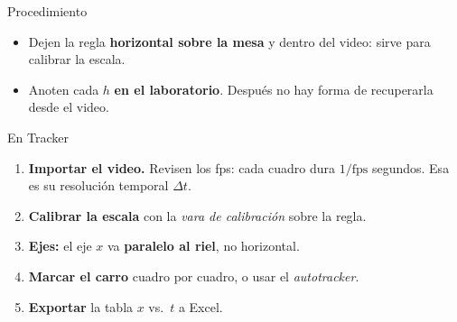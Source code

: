 \documentclass[aspectratio=169,xcolor=dvipsnames]{beamer}
\begin{document}
	\begin{frame}{Procedimiento}
		\begin{center}
		\end{center}
		
		\vspace{0.4cm}
		\begin{itemize}
			\setlength{\itemsep}{6pt}
			\item Dejen la regla \textbf{horizontal sobre la mesa} y dentro del video:
			sirve para calibrar la escala.
			\item Anoten cada $h$ \textbf{en el laboratorio}. Después no hay forma de
			recuperarla desde el video.
		\end{itemize}
	\end{frame}
	
	\begin{frame}{En Tracker}
		\begin{enumerate}
			\setlength{\itemsep}{8pt}
			\item \textbf{Importar el video.} Revisen los fps: cada cuadro dura
			$1/\text{fps}$ segundos. Esa es su resolución temporal $\Delta t$.
			\item \textbf{Calibrar la escala} con la \emph{vara de calibración}
			sobre la regla.
			\item \textbf{Ejes:} el eje $x$ va \textbf{paralelo al riel}, no
			horizontal.
			\item \textbf{Marcar el carro} cuadro por cuadro, o usar el
			\emph{autotracker}.
			\item \textbf{Exportar} la tabla $x$ vs.\ $t$ a Excel.
		\end{enumerate}
		
	\end{frame}
	
\end{document}
